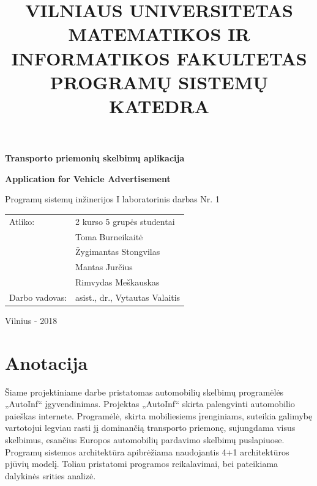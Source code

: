 \documentclass[12pt]{article}
\title{VILNIAUS UNIVERSITETAS \bigbreak \bigbreak 
MATEMATIKOS IR INFORMATIKOS FAKULTETAS \bigbreak \bigbreak 
PROGRAMŲ SISTEMŲ KATEDRA}
\author{}
\date{}
\begin{document}
	\clearpage
	\maketitle
	\thispagestyle{empty}

	\begin{center}
		\begin{Large}
			\textbf{Transporto priemonių skelbimų aplikacija} \bigbreak
		\end{Large}
		\begin{large}
			\textbf{Application for Vehicle Advertisement} \bigbreak
		\end{large}
		Programų sistemų inžinerijos I laboratorinis darbas Nr. 1 \bigbreak

		\bigbreak
		\bigbreak
		\bigbreak
		\bigbreak
		\bigbreak
		\bigbreak
		\bigbreak

		\begin{tabular}{ll}
			Atliko:        & 2 kurso 5 grupės studentai \\
		               	   & Toma Burneikaitė \\
		               	   &  Žygimantas Stongvilas \\
		                   & Mantas Jurčius \\
		                   & Rimvydas Meškauskas \\
			Darbo vadovas: & asist., dr., Vytautas Valaitis
		\end{tabular}

		\bigbreak
		\bigbreak
		\bigbreak
		\bigbreak
		\bigbreak
		\bigbreak
		\bigbreak
		\bigbreak
		\bigbreak
		\bigbreak
		\bigbreak
		\bigbreak
		\bigbreak
		\bigbreak
		\bigbreak

		Vilnius - 2018
	\end{center}
	\pagebreak
	
	\section*{Anotacija}
	
	\justify
	\indent Šiame projektiniame darbe pristatomas automobilių skelbimų programėlės „AutoInf“ įgyvendinimas. Projektas „AutoInf“ skirta  palengvinti automobilio paieškas internete. Programėlė, skirta mobiliesiems įrenginiams, suteikia galimybę vartotojui legviau rasti jį dominančią transporto priemonę, sujungdama visus skelbimus, esančius Europos automobilių pardavimo skelbimų puslapiuose. Programų sistemos architektūra apibrėžiama naudojantis 4+1 architektūros pjūvių modelį. Toliau pristatomi programos reikalavimai, bei pateikiama dalykinės srities analizė.
	\pagebreak
\end{document}

